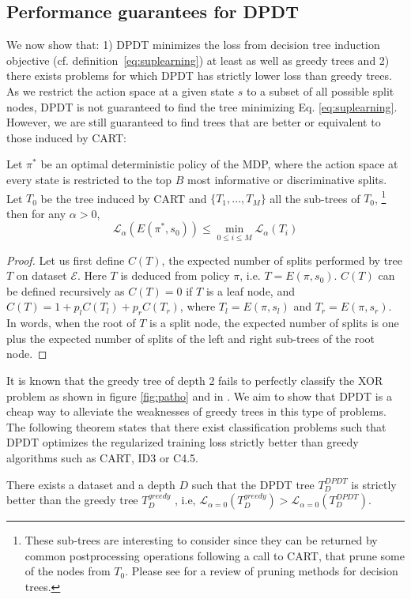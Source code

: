 \subsection{Performance guarantees for DPDT}
We now show that: 1) DPDT minimizes the loss from decision tree induction objective (cf. definition~\ref{eq:suplearning}) at least as well as greedy trees and 2) there exists problems for which DPDT has strictly lower loss than greedy trees. 
As we restrict the action space at a given state $s$ to a subset of all possible split nodes, DPDT is not guaranteed to find the tree minimizing Eq. \ref{eq:suplearning}. However, we are still guaranteed to find trees that are better or equivalent to those induced by CART:
\begin{theorem}\label{prop:cart}
Let $\pi^*$ be an optimal deterministic policy of the MDP, where the action space at every state is restricted to the top $B$ most informative or discriminative splits. 
Let $T_0$ be the tree induced by CART and $\{T_1,\dots,T_M\}$ all the sub-trees of $T_0$, \footnote{These sub-trees are interesting to consider since they can be returned by common postprocessing operations following a call to CART, that prune some of the nodes from $T_0$. Please see \cite{pruning1} for a review of pruning methods for decision trees.} then for any $\alpha > 0$, 
\[
{\mathcal L}_\alpha(E(\pi^*, s_0)) \leq \min_{0\leq i\leq M}{\mathcal L}_\alpha(T_i)
\]
\end{theorem}

\begin{proof}
Let us first define $C(T)$, the expected number of splits performed by tree $T$ on dataset $\mathcal E$. 
Here $T$ is deduced from policy $\pi$, i.e. $T=E(\pi, s_0)$. $C(T)$ can be defined recursively as $C(T) = 0$ if $T$ is a leaf node, and $C(T) = 1 + p_l C(T_l) + p_r  C(T_r)$, where $T_l = E(\pi, s_l)$ and $T_r = E(\pi, s_r)$. 
In words, when the root of $T$ is a split node, the expected number of splits is one plus the expected number of splits of the left and right sub-trees of the root node.
\end{proof}

It is known that the greedy tree of depth 2 fails to perfectly classify the XOR problem as shown in figure \ref{fig:patho} and in \cite{Murthy,how-eff}. We aim to show that DPDT is a cheap way to alleviate the weaknesses of greedy trees in this type of problems. The following theorem states that there exist classification problems such that DPDT optimizes the regularized training loss strictly better than greedy algorithms such as CART, ID3 or C4.5.
\begin{theorem}\label{thm:better_greedy}
There exists a dataset and a depth $D$ such that the DPDT tree $T^{DPDT}_D$ is strictly better than the greedy tree $T^{greedy}_{D}$ , i.e, $\mathcal{L}_{\alpha=0}(T^{greedy}_{D}) > \mathcal{L}_{\alpha=0}(T^{DPDT}_{D})$.
\end{theorem}

